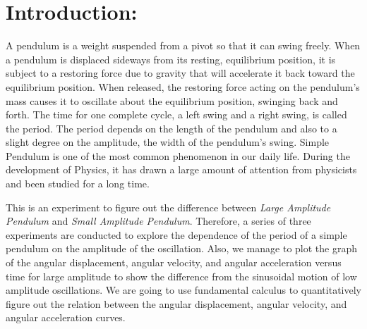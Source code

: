 \tableofcontents
\pagebreak

\parindent=0.5in
\rmfamily

\section{Introduction:}
A pendulum is a weight suspended from a pivot so that it can swing freely. When a pendulum is displaced sideways from its resting, equilibrium position, it is subject to a restoring force due to gravity that will accelerate it back toward the equilibrium position. When released, the restoring force acting on the pendulum's mass causes it to oscillate about the equilibrium position, swinging back and forth. The time for one complete cycle, a left swing and a right swing, is called the period. The period depends on the length of the pendulum and also to a slight degree on the amplitude, the width of the pendulum's swing. Simple Pendulum is one of the most common phenomenon in our daily life. During the development of Physics, it has drawn a large amount of attention from physicists and been studied for a long time. \par
This is an experiment to figure out the difference between \emph{Large Amplitude Pendulum} and \emph{Small Amplitude Pendulum}. Therefore, a series of three experiments are conducted to explore the dependence of the period of a simple pendulum on the amplitude of the oscillation. Also, we manage to plot the graph of the angular displacement, angular velocity, and angular acceleration versus time for large amplitude to show the difference from the sinusoidal motion of low amplitude oscillations. We are going to use fundamental calculus to quantitatively figure out the relation between the angular displacement, angular velocity, and angular acceleration curves.

